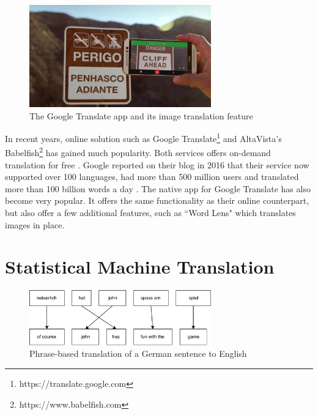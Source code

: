 \begin{figure}[H]
    \centering
    \includegraphics[width=0.7\textwidth]{fig/background_theory/google_translate_rt.png}
    \caption{The Google Translate app and its image translation feature}
    \label{fig:google-translate-rt}
\end{figure}

In recent years, online solution such as Google Translate\footnote{https://translate.google.com} and AltaVista's Babelfish\footnote{https://www.babelfish.com} has gained much popularity. Both services offers on-demand translation for free \citep{hutchins2007machine}. Google reported on their blog in 2016 that their service now supported over 100 languages, had more than 500 million users and translated more than 100 billion words a day \citep{turovsky2016googletranslate}. The native app for Google Translate has also become very popular. It offers the same functionality as their online counterpart, but also offer a few additional features, such as ``Word Lens" which translates images in place.


\section{Statistical Machine Translation}
\begin{figure}[ht]
    \centering
    \includegraphics[width=0.7\textwidth]{fig/related_work/translation_de_en.pdf}
    \caption{Phrase-based translation of a German sentence to English}
    \label{fig:translation-phrase-based}
\end{figure}

